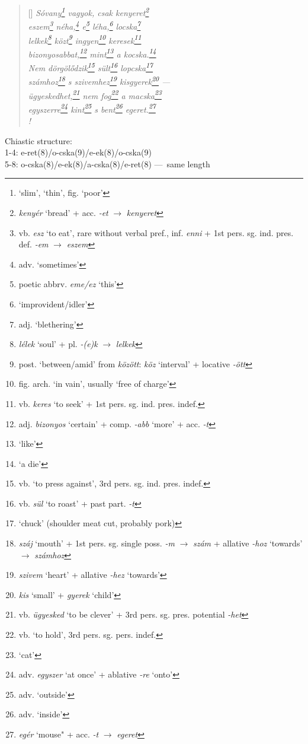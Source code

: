 \documentclass[a4paper,12pt,twoside,final]{book}
\begin{document}
\begin{verse}[\versewidth]
  \it
  Sóvany\footnote{`slim', `thin', fig. `poor'} vagyok, csak
  kenyeret\footnote{\emph{kenyér} `bread' + acc. \emph{-et}
  $\rightarrow$ \emph{kenyeret}} \\
  eszem\footnote{vb. \emph{esz} `to eat', rare without verbal
  pref., inf. \emph{enni} + 1st pers. sg. ind. pres. def. \emph{-em}
  $\rightarrow$ \emph{eszem}} néha,\footnote{adv. `sometimes'} e\footnote{poetic
  abbrv. \emph{eme/ez} `this'} léha,\footnote{`improvident/idler'}
  locska\footnote{adj. `blethering'} \\
  lelkek\footnote{\emph{lélek} `soul' +
  pl. \emph{-(e)k} $\rightarrow$ \emph{lelkek}}
  közt\footnote{post. `between/amid' from \emph{között}: \emph{köz}
  `interval' + locative \emph{-ött}} ingyen\footnote{fig. arch. `in
  vain', usually `free of charge'} keresek\footnote{vb.
  \emph{keres} `to seek' + 1st pers. sg. ind. pres. indef.} \\
  bizonyosabbat,\footnote{adj. \emph{bizonyos} `certain' +
  comp. \emph{-abb} `more' + acc. \emph{-t}} mint\footnote{`like'} a
  kocska.\footnote{`a die'} \\
  Nem dörgölődzik\footnote{vb. `to press against', 3rd
  pers. sg. ind. pres. indef.} sült\footnote{vb. \emph{sül} `to
  roast'  + past part. \emph{-t}} lopcska\footnote{`chuck'
  (shoulder meat cut, probably pork)} \\
  számhoz\footnote{\emph{száj} `mouth' + 1st
  pers. sg. single poss. \emph{-m} $\rightarrow$ \emph{szám} +
  allative \emph{-hoz} `towards' $\rightarrow$ \emph{számhoz}} s
  szivemhez\footnote{\emph{szivem} `heart' +
  allative \emph{-hez} `towards'} kisgyerek\footnote{\emph{kis} `small' +
  \emph{gyerek} `child'} --- \\
  ügyeskedhet,\footnote{vb. \emph{ügyesked} `to be clever' +
  3rd pers. sg. pres. potential \emph{-het}} nem fog\footnote{vb.
  `to hold', 3rd pers. sg. pers. indef.} a macska\footnote{`cat'} \\
  egyszerre\footnote{adv. \emph{egyszer} `at once' +
  ablative \emph{-re} `onto'} kint\footnote{adv. `outside'} s
  bent\footnote{adv. `inside'} egeret.\footnote{\emph{egér}
  `mouse" + acc. \emph{-t} $\rightarrow$ \emph{egeret}} \\!
\end{verse}

\noindent Chiastic structure: \\
1-4: e-ret(8)/o-cska(9)/e-ek(8)/o-cska(9) \\
5-8: o-cska(8)/e-ek(8)/a-cska(8)/e-ret(8) ---~same length
\end{document}

